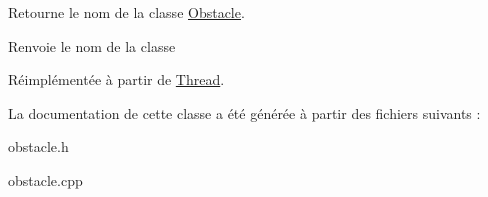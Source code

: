 Retourne le nom de la classe \hyperlink{classObstacle}{Obstacle}. 

\begin{DoxyReturn}{Renvoie}
le nom de la classe 
\end{DoxyReturn}


Réimplémentée à partir de \hyperlink{classThread_ad055e7c603fda2607670f69c32b2d98a}{Thread}.



La documentation de cette classe a été générée à partir des fichiers suivants :\begin{DoxyCompactItemize}
\item 
obstacle.h\item 
obstacle.cpp\end{DoxyCompactItemize}
